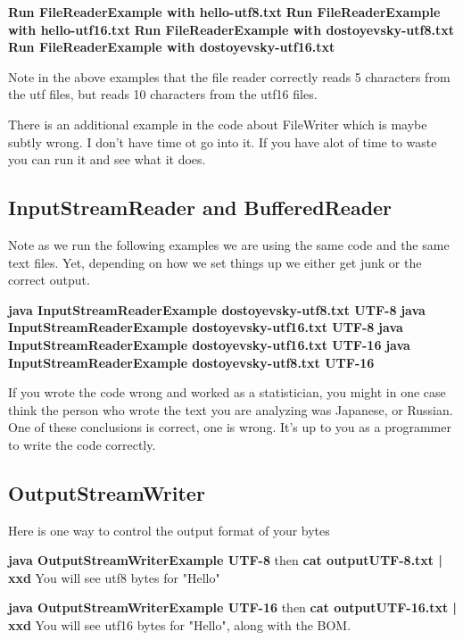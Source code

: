 \documentclass[12pt]{article}
\begin{document}
\begin{center}
\textbf{Run FileReaderExample with hello-utf8.txt}
\textbf{Run FileReaderExample with hello-utf16.txt}
\textbf{Run FileReaderExample with dostoyevsky-utf8.txt}
\textbf{Run FileReaderExample with dostoyevsky-utf16.txt}
\end{center}

Note in the above examples that the file reader correctly reads 5 characters from the utf files, but reads 10 characters from the utf16 files.

There is an additional example in the code about FileWriter which is maybe subtly wrong. I don't have time ot go into it. If you have alot of time to waste you can run it and see what it does. 

\subsection{InputStreamReader and BufferedReader}

Note as we run the following examples we are using the same code and the same text files. Yet, depending on how we set things up we either get junk or the correct output.

\begin{center}
\textbf{java InputStreamReaderExample dostoyevsky-utf8.txt UTF-8}
\textbf{java InputStreamReaderExample dostoyevsky-utf16.txt UTF-8}
\textbf{java InputStreamReaderExample dostoyevsky-utf16.txt UTF-16}
\textbf{java InputStreamReaderExample dostoyevsky-utf8.txt UTF-16}
\end{center}

If you wrote the code wrong and worked as a statistician, you might in one case think the person who wrote the text you are analyzing was Japanese, or Russian. One of these conclusions is correct, one is wrong. It's up to you as a programmer to write the code correctly.

\subsection{OutputStreamWriter}
Here is one way to control the output format of your bytes

\begin{center}
\textbf{java OutputStreamWriterExample UTF-8}
then
\textbf{cat outputUTF-8.txt | xxd}
You will see utf8 bytes for "Hello"
\end{center}

\begin{center}
\textbf{java OutputStreamWriterExample UTF-16}
then
\textbf{cat outputUTF-16.txt | xxd}
You will see utf16 bytes for "Hello", along with the BOM.
\end{center}
\end{document}
